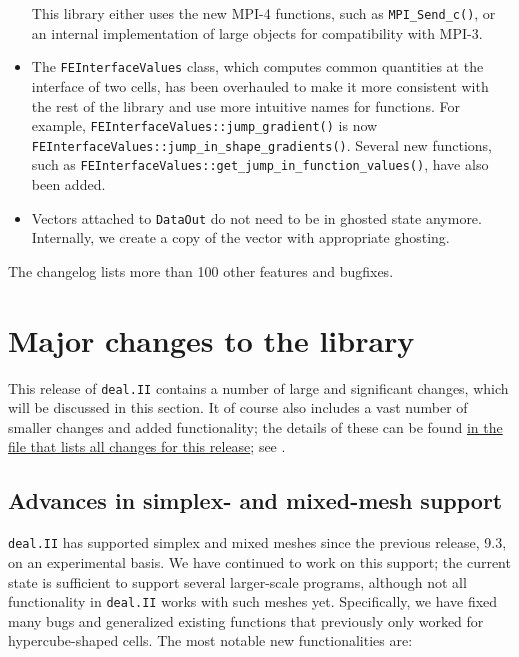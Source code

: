 \documentclass{ansarticle-preprint}
\newcommand{\specialword}[1]{\texttt{#1}}
\newcommand{\dealii}{{\specialword{deal.II}}\xspace}
\begin{document}
\begin{itemize}
  This library either uses the new MPI-4 functions, such as \texttt{MPI\_Send\_c()}, or an internal implementation of large objects for
  compatibility with MPI-3.
  \item The \texttt{FEInterfaceValues} class, which computes common quantities at the interface of two cells, has been overhauled to make it
  more consistent with the rest of the library and use more intuitive names for functions. For example,
  \texttt{FEInterfaceValues::jump\_gradient()} is now \texttt{FEInterfaceValues::jump\_in\_shape\_gradients()}. Several new
  functions, such as \texttt{FEInterfaceValues::get\_jump\_in\_function\_values()}, have also been added.
  \item Vectors attached to \texttt{DataOut} do not need to be in ghosted state anymore. Internally, we create a copy of the vector with appropriate ghosting.
\end{itemize}
%
The changelog lists more than 100 other features and bugfixes.




\section{Major changes to the library}
\label{sec:major}

This release of \dealii{} contains a number of large and significant changes,
which will be discussed in this section.
It of course also includes a
vast number of smaller changes and added functionality; the details of these
can be found
\href{https://dealii.org/developer/doxygen/deal.II/changes_between_9_3_0_and_9_4_0.html}
{in the file that lists all changes for this release}; see \cite{changes94}.


\subsection{Advances in simplex- and mixed-mesh support}\label{sec:simplex}

\dealii{} has supported simplex and mixed meshes since the previous
release, 9.3, on an experimental basis.
We have continued to work on this support; the current state is
sufficient to support several larger-scale programs, although not all
functionality in \dealii{} works with such meshes yet. Specifically,
we have fixed many bugs and generalized existing functions that
previously only worked for hypercube-shaped cells. The most notable
new functionalities are:
\end{document}
